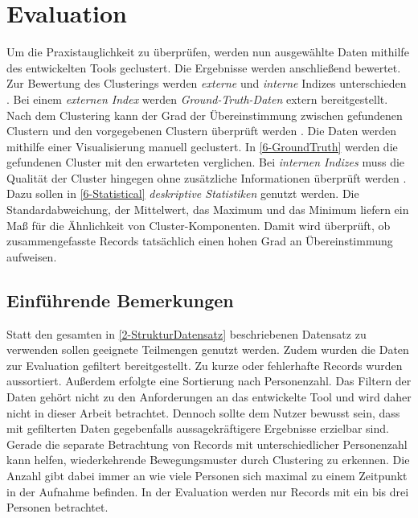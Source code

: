 \chapter{Evaluation}
\label{chapter6}
Um die Praxistauglichkeit zu überprüfen, werden nun ausgewählte Daten
mithilfe des entwickelten Tools geclustert.
Die Ergebnisse werden anschließend bewertet.
Zur Bewertung des Clusterings werden \emph{externe}
und \emph{interne} Indizes unterschieden \citep{aghabozorgi_time-series_2015, warren_liao_clustering_2005}.
Bei einem \emph{externen Index} werden \emph{Ground-Truth-Daten} extern bereitgestellt.
Nach dem Clustering kann der Grad der Übereinstimmung zwischen gefundenen Clustern
und den vorgegebenen Clustern überprüft werden \citep{aghabozorgi_time-series_2015, warren_liao_clustering_2005}.
Die Daten werden mithilfe einer Visualisierung manuell geclustert.
In \autoref{6-GroundTruth} werden die gefundenen Cluster mit den erwarteten verglichen.
Bei \emph{internen Indizes} muss die Qualität der Cluster hingegen
ohne zusätzliche Informationen überprüft werden \citep{aghabozorgi_time-series_2015, warren_liao_clustering_2005}.
Dazu sollen in \autoref{6-Statistical} \emph{deskriptive Statistiken} genutzt werden.
Die Standardabweichung, der Mittelwert, das Maximum und das Minimum liefern
ein Maß für die Ähnlichkeit von Cluster-Komponenten.
Damit wird überprüft,
ob zusammengefasste Records tatsächlich einen hohen Grad an Übereinstimmung aufweisen.

\section{Einführende Bemerkungen}
\label{6-Bemerkungen}
Statt den gesamten in \autoref{2-StrukturDatensatz} beschriebenen Datensatz zu verwenden
sollen geeignete Teilmengen genutzt werden.
Zudem wurden die Daten zur Evaluation gefiltert bereitgestellt.
Zu kurze oder fehlerhafte Records wurden aussortiert.
Außerdem erfolgte eine Sortierung nach Personenzahl.
Das Filtern der Daten gehört nicht zu den Anforderungen an das entwickelte Tool
und wird daher nicht in dieser Arbeit betrachtet.
Dennoch sollte dem Nutzer bewusst sein,
dass mit gefilterten Daten gegebenfalls aussagekräftigere Ergebnisse erzielbar sind.
Gerade die separate Betrachtung von Records mit unterschiedlicher Personenzahl kann helfen,
wiederkehrende Bewegungsmuster durch Clustering zu erkennen.
Die Anzahl gibt dabei immer an wie viele Personen sich maximal
zu einem Zeitpunkt in der Aufnahme befinden.
In der Evaluation werden nur Records mit ein bis drei Personen betrachtet.

